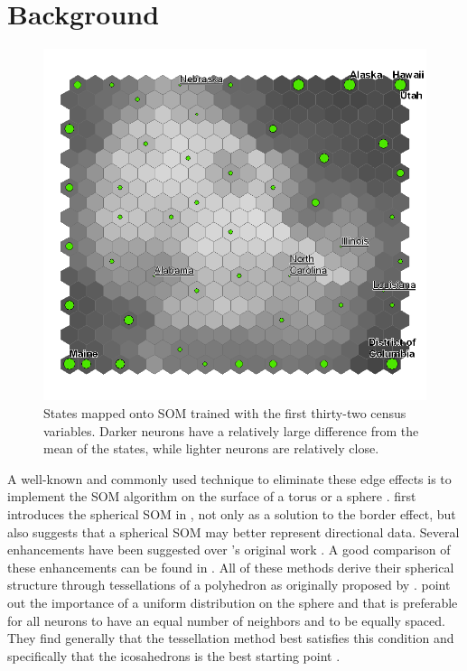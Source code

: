 \documentclass[12pt]{article}
\begin{document}
\section{Background}
\begin{figure}
\centering
\includegraphics[width=0.85\linewidth]{gridedge.png}
\caption{States mapped onto SOM trained with the first thirty-two census
variables.  Darker neurons have a relatively large difference from the mean of
the states, while lighter neurons are relatively close.}
\label{figure1}
\end{figure}

A well-known and commonly used technique to eliminate these edge effects is to
implement the SOM algorithm on the surface of a torus or a sphere \citep{ritter99}.
\citeauthor{ritter99} first introduces the spherical SOM in
\citeyear{ritter99}, not only as a solution to the border effect, but also
suggests that a spherical SOM may better represent directional data. Several
enhancements have been suggested over \citeauthor{ritter99}'s original work
\citep{Wu:2006lr,Sangole:2003lr,Nishio:2006fk,boudjemai2003}.  A good
comparison of these enhancements can be found in \citep{Wu:2006lr}.  All of
these methods derive their spherical structure through tessellations of a
polyhedron as originally proposed by \citeauthor{ritter99}.  \cite{Wu:2006lr}
point out the importance of a uniform distribution on the sphere and that is
preferable for all neurons to have an equal number of neighbors and to be
equally spaced.  They find generally that the tessellation method best
satisfies this condition and specifically that the icosahedrons is the best
starting point \citep{wu2005}.
\end{document}
